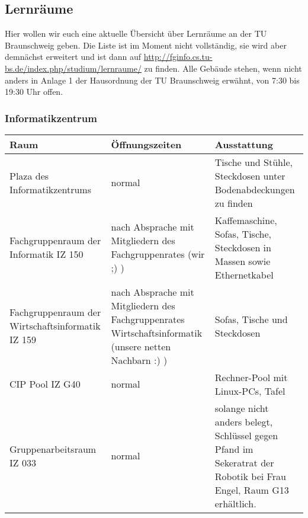\subsection{Lernräume}
	Hier wollen wir euch eine aktuelle Übersicht über Lernräume an der TU Braunschweig geben. Die Liste ist im Moment nicht vollständig, sie wird aber demnächst erweitert und ist dann auf \url{http://fginfo.cs.tu-bs.de/index.php/studium/lernraume/} zu finden. Alle Gebäude stehen, wenn nicht anders in Anlage 1 der Hausordnung der TU Braunschweig erwähnt, von 7:30 bis 19:30 Uhr offen.
	\subsubsection*{Informatikzentrum}
		\begin{tabular}{|p{4cm}|p{4cm}|p{8cm}|}
			\hline Raum & Öffnungszeiten & Ausstattung \\ 
			\hline Plaza des Informatikzentrums & normal &  Tische und Stühle, Steckdosen unter Bodenabdeckungen zu finden \\
			\hline Fachgruppenraum der Informatik IZ 150 &
			nach Absprache mit Mitgliedern des
			Fachgruppenrates (wir ;) ) & Kaffemaschine, Sofas, Tische, Steckdosen in Massen sowie Ethernetkabel\\ 
			\hline Fachgruppenraum der Wirtschaftsinformatik
			IZ 159 & nach Absprache mit Mitgliedern des
			Fachgruppenrates Wirtschaftsinformatik (unsere
			netten Nachbarn :) )& Sofas, Tische und Steckdosen \\ 
			\hline CIP Pool IZ G40 & normal & Rechner-Pool mit Linux-PCs, Tafel\\ 
			\hline Gruppenarbeitsraum IZ 033 & normal &
			solange nicht anders belegt, Schlüssel gegen
			Pfand im Sekeratrat der Robotik bei Frau Engel,
			Raum G13 erhältlich.
			\hline
		\end{tabular}
